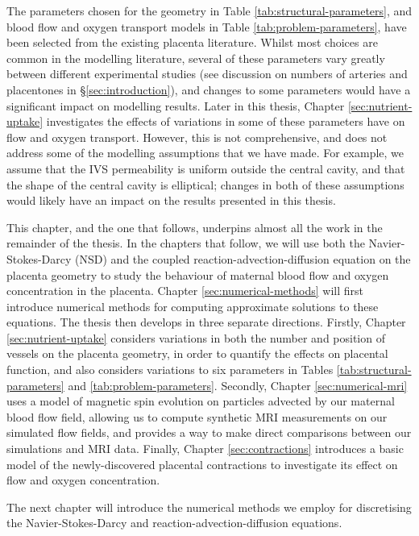         The parameters chosen for the geometry in Table \ref{tab:structural-parameters}, and blood flow and oxygen transport models in Table \ref{tab:problem-parameters}, have been selected from the existing placenta literature. Whilst most choices are common in the modelling literature, several of these parameters vary greatly between different experimental studies (see discussion on numbers of arteries and placentones in \S\ref{sec:introduction}), and changes to some parameters would have a significant impact on modelling results. Later in this thesis, Chapter \ref{sec:nutrient-uptake} investigates the effects of variations in some of these parameters have on flow and oxygen transport. However, this is not comprehensive, and does not address some of the modelling assumptions that we have made. For example, we assume that the IVS permeability is uniform outside the central cavity, and that the shape of the central cavity is elliptical; changes in both of these assumptions would likely have an impact on the results presented in this thesis.

        This chapter, and the one that follows, underpins almost all the work in the remainder of the thesis. In the chapters that follow, we will use both the Navier-Stokes-Darcy (NSD) and the coupled reaction-advection-diffusion equation on the placenta geometry to study the behaviour of maternal blood flow and oxygen concentration in the placenta. Chapter \ref{sec:numerical-methods} will first introduce numerical methods for computing approximate solutions to these equations. The thesis then develops in three separate directions. Firstly, Chapter \ref{sec:nutrient-uptake} considers variations in both the number and position of vessels on the placenta geometry, in order to quantify the effects on placental function, and also considers variations to six parameters in Tables \ref{tab:structural-parameters} and \ref{tab:problem-parameters}. Secondly, Chapter \ref{sec:numerical-mri} uses a model of magnetic spin evolution on particles advected by our maternal blood flow field, allowing us to compute synthetic MRI measurements on our simulated flow fields, and provides a way to make direct comparisons between our simulations and MRI data. Finally, Chapter \ref{sec:contractions} introduces a basic model of the newly-discovered placental contractions to investigate its effect on flow and oxygen concentration.

        The next chapter will introduce the numerical methods we employ for discretising the Navier-Stokes-Darcy and reaction-advection-diffusion equations.